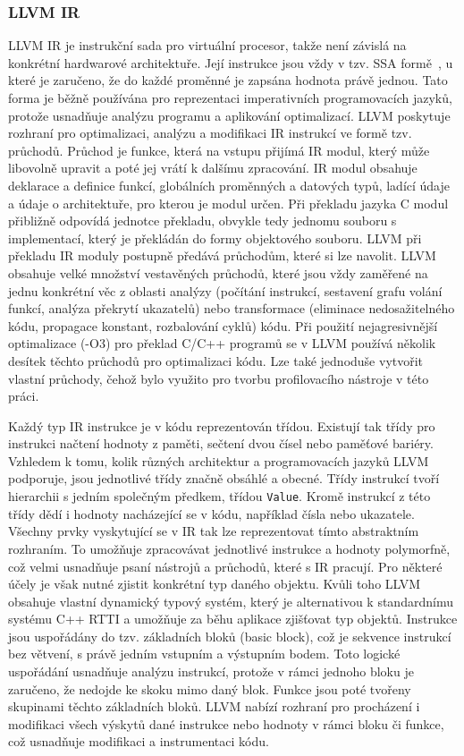 \subsubsection*{LLVM IR}
LLVM IR je instrukční sada pro virtuální procesor, takže není závislá na konkrétní hardwarové architektuře. Její instrukce jsou vždy v tzv. SSA formě~\cite{ssa1, ssa2}, u které je zaručeno, že do každé proměnné je zapsána hodnota právě jednou. Tato forma je běžně používána pro reprezentaci imperativních programovacích jazyků, protože usnadňuje analýzu programu a aplikování optimalizací. LLVM poskytuje rozhraní pro optimalizaci, analýzu a modifikaci IR instrukcí ve formě tzv. průchodů.
Průchod je funkce, která na vstupu přijímá IR modul, který může libovolně upravit a poté jej vrátí k dalšímu zpracování. IR modul obsahuje deklarace a definice funkcí, globálních proměnných a datových typů, ladící údaje a údaje o architektuře, pro kterou je modul určen. Při překladu jazyka C modul přibližně odpovídá jednotce překladu, obvykle tedy jednomu souboru s implementací, který je překládán do formy objektového souboru. LLVM při překladu IR moduly postupně předává průchodům, které si lze navolit. LLVM obsahuje velké množství vestavěných průchodů, které jsou vždy zaměřené na jednu konkrétní věc z oblasti analýzy (počítání instrukcí, sestavení grafu volání funkcí, analýza překrytí ukazatelů) nebo transformace (eliminace nedosažitelného kódu, propagace konstant, rozbalování cyklů) kódu. Při použití nejagresivnější optimalizace (-O3) pro překlad C/C++ programů se v LLVM používá několik desítek těchto průchodů pro optimalizaci kódu. Lze také jednoduše vytvořit vlastní průchody, čehož bylo využito pro tvorbu profilovacího nástroje v této práci.

Každý typ IR instrukce je v kódu reprezentován třídou. Existují tak třídy pro instrukci načtení hodnoty z paměti, sečtení dvou čísel nebo paměťové bariéry. Vzhledem k tomu, kolik různých architektur a programovacích jazyků LLVM podporuje, jsou jednotlivé třídy značně obsáhlé a obecné. Třídy instrukcí tvoří hierarchii s jedním společným předkem, třídou \texttt{Value}. Kromě instrukcí z této třídy dědí i hodnoty nacházející se v kódu, například čísla nebo ukazatele. Všechny prvky vyskytující se v IR tak lze reprezentovat tímto abstraktním rozhraním. To umožňuje zpracovávat jednotlivé instrukce a hodnoty polymorfně, což velmi usnadňuje psaní nástrojů a průchodů, které s IR pracují. Pro některé účely je však nutné zjistit konkrétní typ daného objektu. Kvůli toho LLVM obsahuje vlastní dynamický typový systém, který je alternativou k standardnímu systému C++ RTTI a umožňuje za běhu aplikace zjišťovat typ objektů.
Instrukce jsou uspořádány do tzv. základních bloků (basic block), což je sekvence instrukcí bez větvení, s právě jedním vstupním a výstupním bodem. Toto logické uspořádání usnadňuje analýzu instrukcí, protože v rámci jednoho bloku je zaručeno, že nedojde ke skoku mimo daný blok. Funkce jsou poté tvořeny skupinami těchto základních bloků. LLVM nabízí rozhraní pro procházení i modifikaci všech výskytů dané instrukce nebo hodnoty v rámci bloku či funkce, což usnadňuje modifikaci a instrumentaci kódu.

